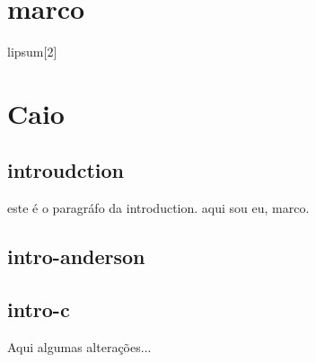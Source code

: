 
    \section{marco}
    lipsum[2]
    \section{Caio}


    \subsection{introudction}
    este é o paragráfo da introduction.
    aqui sou eu, marco.

    \subsection{intro-anderson}

    \subsection{intro-c}
        Aqui algumas alterações...



